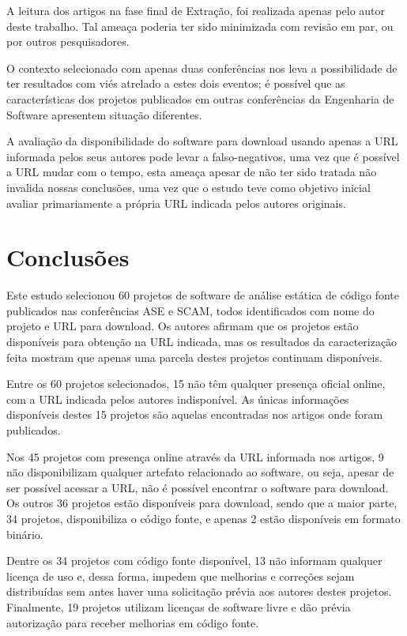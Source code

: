 A leitura dos artigos na fase final de Extração, foi realizada
apenas pelo autor deste trabalho. Tal ameaça poderia ter sido minimizada com
revisão em par, ou por outros pesquisadores.

O contexto selecionado com apenas duas conferências nos leva a possibilidade de
ter resultados com viés atrelado a estes dois eventos; é possível que as
características dos projetos publicados em outras conferências da Engenharia de
Software apresentem situação diferentes.

A avaliação da disponibilidade do software para download usando apenas a URL
informada pelos seus autores pode levar a falso-negativos, uma vez que é
possível a URL mudar com o tempo, esta ameaça apesar de não ter sido
tratada não invalida nossas conclusões, uma vez que o estudo teve como objetivo
inicial avaliar primariamente a própria URL indicada pelos autores originais.


\section{Conclusões} \label{estudo1:conclusoes} %

Este estudo selecionou 60 projetos de software de análise estática de código
fonte publicados nas conferências ASE e SCAM, todos identificados com nome do
projeto e URL para download. Os autores afirmam que os projetos estão
disponíveis para obtenção na URL indicada, mas os resultados da caracterização
feita mostram que apenas uma parcela destes projetos continuam disponíveis.

Entre os 60 projetos selecionados, 15 não têm qualquer presença oficial online,
com a URL indicada pelos autores indisponível. As únicas informações
disponíveis destes 15 projetos são aquelas encontradas nos artigos onde foram
publicados.

Nos 45 projetos com presença online através da URL informada nos artigos, 9 não
disponibilizam qualquer artefato relacionado ao software, ou seja, apesar de
ser possível acessar a URL, não é possível encontrar o software para download.
Os outros 36 projetos estão disponíveis para download, sendo que
a maior parte, 34 projetos, disponibiliza o código fonte, e apenas 2
estão disponíveis em formato binário.

Dentre os 34 projetos com código fonte disponível, 13 não informam qualquer
licença de uso e, dessa forma, impedem que melhorias e correções
sejam distribuídas sem antes haver uma solicitação prévia aos autores destes
projetos. Finalmente, 19 projetos utilizam licenças de software livre e dão
prévia autorização para receber melhorias em código fonte.

